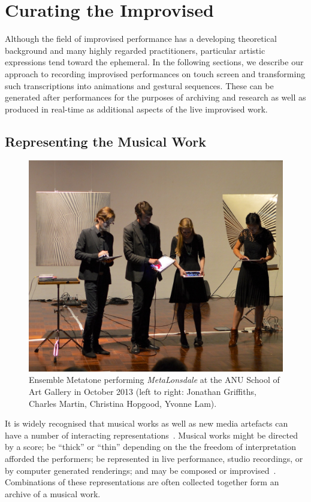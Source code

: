 \documentclass[graybox]{svmult}
\begin{document}
\section{Curating the Improvised}

Although the field of improvised performance has a developing
theoretical background and many highly regarded practitioners,
particular artistic expressions tend toward the ephemeral. In the
following sections, we describe our approach to recording improvised
performances on touch screen and transforming such transcriptions into
animations and gestural sequences. These can be generated after
performances for the purposes of archiving and research as well
as produced in real-time as additional aspects of the live improvised work.

\subsection{Representing the Musical Work}

\begin{figure}
  \centering
  \includegraphics[width=\textwidth]{figures/ensemblemetatone}
  \caption{Ensemble Metatone performing \emph{MetaLonsdale} at the ANU
    School of Art Gallery in October 2013 (left to right: Jonathan
    Griffiths, Charles Martin, Christina Hopgood, Yvonne Lam).}
  \label{ensemblemetatoneperforming}
\end{figure}

It is widely recognised that musical works as well as new media
artefacts can have a number of interacting
representations~\cite{Rinehart:2007pi}. Musical works might be
directed by a score; be ``thick'' or ``thin'' depending on the the
freedom of interpretation afforded the performers; be represented in
live performance, studio recordings, or by computer generated
renderings; and may be composed or improvised~\cite{Davies:2005fj}.
Combinations of these representations are often collected together
form an archive of a musical work.
\end{document}
